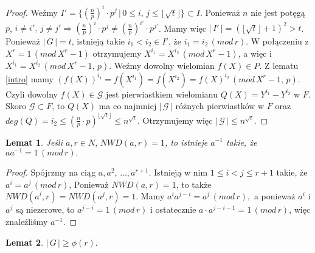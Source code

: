 \documentclass[declaration,shortabstract]{iithesis}
\theoremstyle{definition}
\theoremstyle{remark} \newtheorem{observation}{Obserwacja}
\theoremstyle{plain} \newtheorem{theorem}{Twierdzenie}
\theoremstyle{plain} \newtheorem{lemma}{Lemat}
\theoremstyle{remark} \newtheorem*{remark*}{Uwaga}
\theoremstyle{reminder} \newtheorem*{reminder*}{Przypomnienie}
\begin{document}
\begin{proof}
	Weźmy $I' = \{(\frac{n}{p})^i \cdot p^j \, | \, 0 \leq i, \, j \leq \lfloor \sqrt{t} \rfloor \} \subset I$. Ponieważ $n$ nie jest potęgą $p$, $i \neq i', \, j \neq j' \Rightarrow (\frac{n}{p})^i \cdot p^j \neq (\frac{n}{p})^{i'} \cdot p^{j'}$. Mamy więc $| \, I' \, | = (\lfloor \sqrt{t} \rfloor + 1)^2 > t$. Ponieważ $| \, G \, | = t$, istnieją takie $i_1 < i_2 \in I'$, że $i_1 = i_2 \, (mod \, r)$. W połączeniu z $X^r = 1 \, (mod \, X^r - 1)$ otrzymujemy $X^{i_1} = X^{i_2} \, (mod \, X^r - 1)$, a więc i $X^{i_1} = X^{i_2} \, (mod \, X^r - 1, \, p)$.  Weźmy dowolny wielomian $f(X) \in P$. Z lematu \ref{intro} mamy $(f(X))^{i_1} = f(X^{i_1}) = f(X^{i_2}) = f(X)^{i_2} \, (mod \,  X^r - 1, \, p)$. Czyli dowolny $f(X) \in \mathcal{G}$ jest pierwiastkiem wielomianu $Q(X) = Y^{i_1} - Y^{i_2}$ w $F$. Skoro $\mathcal{G} \subset F$, to $Q(X)$ ma co najmniej $| \, \mathcal{G} \, |$ różnych pierwiastków w $F$ oraz $deg(Q) = i_2 \leq (\frac{n}{p} \cdot p)^{\lfloor \sqrt{t} \rfloor} \leq n^{\sqrt{t}}$. Otrzymujemy więc $| \, \mathcal{G} \, | \leq n^{\sqrt{t}}$.
\end{proof}

\begin{lemma}\label{odwrotny}
	Jeśli $a, r \in N, \, NWD(a, r) = 1$, to istnieje $a^{-1}$ takie, że $aa^{-1} = 1 \, (mod \, r).$
\end{lemma}
	
\begin{proof}
	Spójrzmy na ciąg $a, a^2, \, \dots, a^{r+1}$. Istnieją w nim $1 \leq i < j \leq r + 1$ takie, że $a^i = a^j \, (mod \, r)$, Ponieważ $NWD(a, r) = 1$, to także $NWD(a^i, r) = NWD(a^j, r) = 1$. Mamy $a^ia^{j-i} = a^j \, (mod \, r),$ a ponieważ $a^i$ i $a^j$ są niezerowe, to $a^{j - i} = 1 \, (mod \, r)$ i ostatecznie $a \cdot a^{j - i - 1} = 1 \, (mod \, r)$, więc znaleźliśmy $a^{-1}$.
\end{proof}

\begin{lemma} \label{phi_r}
	$| \, G \, | \geq \phi(r).$
\end{lemma}
	
\end{document}
